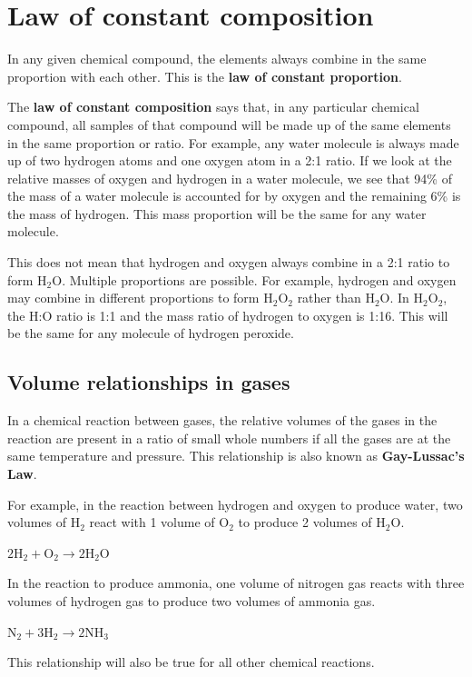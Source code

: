             \section{Law of constant composition}
            \nopagebreak
      \label{m38711*id65065}In any given chemical compound, the elements always combine in the same proportion with each other. This is the \textbf{law of constant proportion}.\par 
      \label{m38711*id65075}The \textbf{law of constant composition} says that, in any particular chemical compound, all samples of that compound will be made up of the same elements in the same proportion or ratio. For example, any water molecule is always made up of two hydrogen atoms and one oxygen atom in a 2:1 ratio. If we look at the relative masses of oxygen and hydrogen in a water molecule, we see that 94\% of the mass of a water molecule is accounted for by oxygen and the remaining 6\% is the mass of hydrogen. This mass proportion will be the same for any water molecule.\par 
      \label{m38711*id65089}This does not mean that hydrogen and oxygen always combine in a 2:1 ratio to form $\mathrm{H}{}_{2}\mathrm{O}$. Multiple proportions are possible. For example, hydrogen and oxygen may combine in different proportions to form $\mathrm{H}{}_{2}\mathrm{O}{}_{2}$ rather than $\mathrm{H}{}_{2}\mathrm{O}$. In $\mathrm{H}{}_{2}\mathrm{O}{}_{2}$, the H:O ratio is 1:1 and the mass ratio of hydrogen to oxygen is 1:16. This will be the same for any molecule of hydrogen peroxide.\par 
    \label{m38711*cid7}
            \subsection*{Volume relationships in gases}
            \nopagebreak
      \label{m38711*id65179}In a chemical reaction between gases, the relative volumes of the gases in the reaction are present in a ratio of small whole numbers if all the gases are at the same temperature and pressure. This relationship is also known as \textbf{Gay-Lussac's Law}.\par 
      \label{m38711*id65189}For example, in the reaction between hydrogen and oxygen to produce water, two volumes of $\mathrm{H}{}_{2}$ react with 1 volume of $\mathrm{O}{}_{2}$ to produce 2 volumes of $\mathrm{H}{}_{2}\mathrm{O}$.\par 
      \label{m38711*id65237}$2\mathrm{H}{}_{2}+\mathrm{O}{}_{2}\to 2\mathrm{H}{}_{2}\mathrm{O}$\par 
      \label{m38711*id65282}In the reaction to produce ammonia, one volume of nitrogen gas reacts with three volumes of hydrogen gas to produce two volumes of ammonia gas.\par 
      \label{m38711*id65286}$\mathrm{N}{}_{2}+3\mathrm{H}{}_{2}\to 2\mathrm{NH}{}_{3}$
      \par 
      \label{m38711*id65329}This relationship will also be true for all other chemical reactions.\par 
    \label{m38711*cid8}

